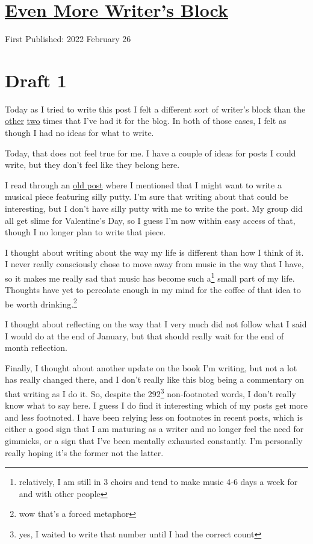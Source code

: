 \documentclass[12pt]{article}[titlepage]
\newcommand{\1}{\={a}}
\newcommand{\2}{\={e}}
\newcommand{\3}{\={\i}}
\newcommand{\4}{\=o}
\newcommand{\5}{\=u}
\newcommand{\6}{\={A}}
\renewcommand{\,}{\textsuperscript{,}}
\begin{document}
\doublespacing
\section{\href{writers-block-3.html}{Even More Writer's Block}}
First Published: 2022 February 26

\section{Draft 1}
Today as I tried to write this post I felt a different sort of writer's block than the \href{writers-block.html}{other} \href{writers-block-2.html}{two} times that I've had it for the blog.
In both of those cases, I felt as though I had no ideas for what to write.

Today, that does not feel true for me.
I have a couple of ideas for posts I could write, but they don't feel like they belong here.

I read through an \href{silly-putty-and-pitch.html}{old post} where I mentioned that I might want to write a musical piece featuring silly putty.
I'm sure that writing about that could be interesting, but I don't have silly putty with me to write the post.
My group did all get slime for Valentine's Day, so I guess I'm now within easy access of that, though I no longer plan to write that piece.

I thought about writing about the way my life is different than how I think of it.
I never really consciously chose to move away from music in the way that I have, so it makes me really sad that music has become such a\footnote{relatively, I am still in 3 choirs and tend to make music 4-6 days a week for and with other people} small part of my life.
Thoughts have yet to percolate enough in my mind for the coffee of that idea to be worth drinking.\footnote{wow that's a forced metaphor}

I thought about reflecting on the way that I very much did not follow what I said I would do at the end of January, but that should really wait for the end of month reflection.

Finally, I thought about another update on the book I'm writing, but not a lot has really changed there, and I don't really like this blog being a commentary on that writing as I do it.
So, despite the 292\footnote{yes, I waited to write that number until I had the correct count} non-footnoted words, I don't really know what to say here.
I guess I do find it interesting which of my posts get more and less footnoted.
I have been relying less on footnotes in recent posts, which is either a good sign that I am maturing as a writer and no longer feel the need for gimmicks, or a sign that I've been mentally exhausted constantly.
I'm personally really hoping it's the former not the latter.
\end{document}
